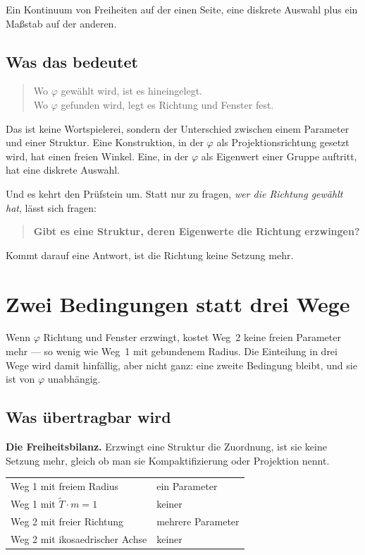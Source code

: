 \documentclass[11pt]{report}
\begin{document}
Ein Kontinuum von Freiheiten auf der einen Seite, eine diskrete Auswahl
plus ein Maßstab auf der anderen.

\section{Was das bedeutet}

\begin{quote}
Wo $\varphi$ gewählt wird, ist es hineingelegt.\\
Wo $\varphi$ gefunden wird, legt es Richtung und Fenster fest.
\end{quote}

Das ist keine Wortspielerei, sondern der Unterschied zwischen einem
Parameter und einer Struktur. Eine Konstruktion, in der $\varphi$ als
Projektionsrichtung gesetzt wird, hat einen freien Winkel. Eine, in der
$\varphi$ als Eigenwert einer Gruppe auftritt, hat eine diskrete
Auswahl.

Und es kehrt den Prüfstein um. Statt nur zu fragen, \emph{wer die
Richtung gewählt hat}, lässt sich fragen:

\begin{quote}
\textbf{Gibt es eine Struktur, deren Eigenwerte die Richtung
erzwingen?}
\end{quote}

Kommt darauf eine Antwort, ist die Richtung keine Setzung mehr.

\chapter{Zwei Bedingungen statt drei Wege}

Wenn $\varphi$ Richtung und Fenster erzwingt, kostet Weg~2 keine freien
Parameter mehr --- so wenig wie Weg~1 mit gebundenem Radius. Die
Einteilung in drei Wege wird damit hinfällig, aber nicht ganz: eine
zweite Bedingung bleibt, und sie ist von $\varphi$ unabhängig.

\section{Was übertragbar wird}

\textbf{Die Freiheitsbilanz.} Erzwingt eine Struktur die Zuordnung, ist
sie keine Setzung mehr, gleich ob man sie Kompaktifizierung oder
Projektion nennt.
\begin{center}
\begin{tabular}{ll}
Weg 1 mit freiem Radius & ein Parameter \\
Weg 1 mit $\tilde T \cdot m = 1$ & keiner \\
Weg 2 mit freier Richtung & mehrere Parameter \\
Weg 2 mit ikosaedrischer Achse & keiner \\
\end{tabular}
\end{center}
\end{document}
